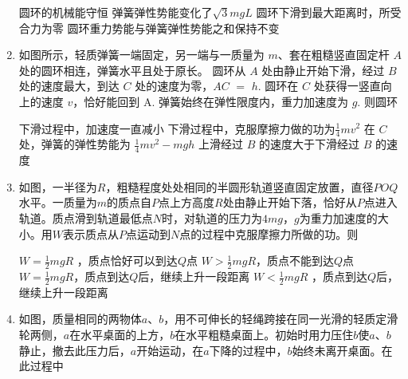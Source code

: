 \begin{enumerate}[leftmargin=0em]
\fourchoices
{圆环的机械能守恒}
{弹簧弹性势能变化了$\sqrt{3}mgL$}
{圆环下滑到最大距离时，所受合力为零}
{圆环重力势能与弹簧弹性势能之和保持不变}




\item
{}
如图所示，轻质弹簧一端固定，另一端与一质量为 $ m $、套在粗糙竖直固定杆 $ A $ 处的圆环相连，弹簧水平且处于原长。 圆环从 $ A $ 处由静止开始下滑，经过 $ B $ 处的速度最大，到达 $ C $ 处的速度为零，$ AC $ $ = $ $ h $. 圆环在 $ C $ 处获得一竖直向上的速度 $ v $，恰好能回到 A. 弹簧始终在弹性限度内，重力加速度为 $ g $. 则圆环  
\begin{figure}[h!]
\centering

\end{figure}


\fourchoices
{下滑过程中，加速度一直减小}
{下滑过程中，克服摩擦力做的功为$ \frac{ 1 }{ 4 } mv^{2} $}
{在 $ C $ 处，弹簧的弹性势能为 $\frac { 1 } { 4 } m v ^ { 2 } - m g h$}
{上滑经过 $ B $ 的速度大于下滑经过 $ B $ 的速度}




\item
{}
如图，一半径为$ R $，粗糙程度处处相同的半圆形轨道竖直固定放置，直径$ POQ $水平。一质量为$ m $的质点自$ P $点上方高度$ R $处由静止开始下落，恰好从$ P $点进入轨道。质点滑到轨道最低点$ N $时，对轨道的压力为$ 4mg $，$ g $为重力加速度的大小。用$ W $表示质点从$ P $点运动到$ N $点的过程中克服摩擦力所做的功。则  
\begin{figure}[h!]
\centering

\end{figure}


\fourchoices
{$W = \frac { 1 } { 2 } m g R$ ，质点恰好可以到达$ Q $点}
{$W > \frac { 1 } { 2 } m g R$，质点不能到达$ Q $点}
{$W = \frac { 1 } { 2 } m g R$，质点到达$ Q $后，继续上升一段距离}
{$W < \frac { 1 } { 2 } m g R$ ，质点到达$ Q $后，继续上升一段距离}





\item
{}
如图，质量相同的两物体$ a $、$ b $，用不可伸长的轻绳跨接在同一光滑的轻质定滑轮两侧，$ a $在水平桌面的上方，$ b $在水平粗糙桌面上。初始时用力压住$ b $使$ a $、$ b $静止，撤去此压力后，$ a $开始运动，在$ a $下降的过程中，$ b $始终未离开桌面。在此过程中  
\begin{figure}[h!]
\centering

\end{figure}


\end{enumerate}
